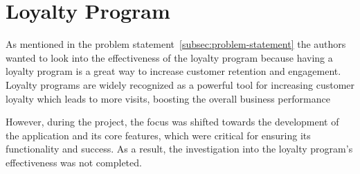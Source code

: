 \section{Loyalty Program}\label{sec:loyalty-program}

As mentioned in the problem statement~\ref{subsec:problem-statement} the authors wanted to look into the effectiveness
of the loyalty program because having a loyalty program is a great way to increase customer retention and
engagement.
Loyalty programs are widely recognized as a powerful tool for increasing customer loyalty which leads to more visits,
boosting the overall business performance

However, during the project, the focus was shifted towards the development of the application and its core features,
which were critical for ensuring its functionality and success.
As a result, the investigation into the loyalty program's effectiveness was not completed.

